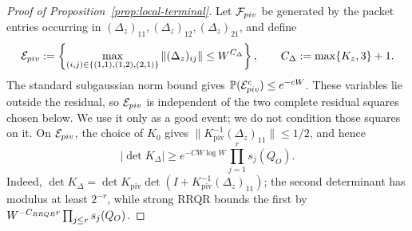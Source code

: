 \documentclass[10pt,a4paper]{amsart}
\renewcommand{\P}{\mathbb P}
\begin{document}
\begin{proof}[Proof of Proposition~\ref{prop:local-terminal}]
Let \(\mathcal F_{\rm piv}\) be generated by the packet entries occurring
in \((\Delta_z)_{11},(\Delta_z)_{12},(\Delta_z)_{21}\), and define
\begin{equation}
 \mathcal E_{\rm piv}:=
 \left\{\max_{(i,j)\in\{(1,1),(1,2),(2,1)\}}
 \|(\Delta_z)_{ij}\|\leq W^{C_\Delta}\right\},
 \qquad C_\Delta:=\max\{K_z,3\}+1.
 \label{eq:local-pivot-exposure-event}
\end{equation}
The standard subgaussian norm bound gives
\(\P(\mathcal E_{\rm piv}^c)\leq e^{-cW}\).  These variables lie outside
the residual, so \(\mathcal E_{\rm piv}\) is independent of the two
complete residual squares chosen below.  We use it only as a good event;
we do not condition those squares on it.  On \(\mathcal E_{\rm piv}\),
the choice of \(K_0\) gives
\(\|K_{\mathrm{piv}}^{-1}(\Delta_z)_{11}\|\leq1/2\), and hence
\begin{equation}
 |\det K_\Delta|
 \geq e^{-CW\log W}\prod_{j=1}^r s_j(Q_O).
 \label{eq:local-pivot-det}
\end{equation}
Indeed,
 \(\det K_\Delta=\det K_{\mathrm{piv}}
 \det(I+K_{\mathrm{piv}}^{-1}(\Delta_z)_{11})\);
the second determinant has modulus at least \(2^{-r}\), while strong
RRQR bounds the first by
\(W^{-C_{\rm RRQR}r}\prod_{j\leq r}s_j(Q_O)\).


\end{proof}
\end{document}
